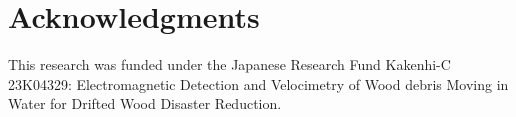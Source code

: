 \documentclass[lettersize,journal]{IEEEtran}
\begin{document}
\section*{Acknowledgments}
This research was funded under the Japanese Research Fund Kakenhi-C 23K04329:
Electromagnetic Detection and Velocimetry of Wood debris Moving in Water for
Drifted Wood Disaster Reduction.










 







\vfill
\end{document}
